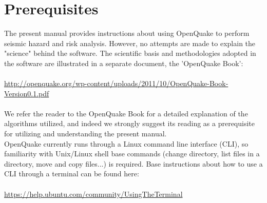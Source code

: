 \section{Prerequisites}
The present manual provides instructions about using OpenQuake to perform seismic hazard and risk analysis. However, no attempts are made to explain the "science" behind the software. The scientific basis and methodologies adopted in the software are illustrated in a separate document, the 'OpenQuake Book':\\ \\
\href{http://openquake.org/wp-content/uploads/2011/10/OpenQuake-Book_Version0.1.pdf}
   {http://openquake.org/wp-content/uploads/2011/10/OpenQuake-Book-Version0.1.pdf}\\ \\
We refer the reader to the OpenQuake Book for a detailed explanation of the algorithms utilized, and indeed we strongly suggest its reading as a prerequisite for utilizing and understanding the present manual.\\
OpenQuake currently runs through a Linux command line interface (CLI), so familiarity with Unix/Linux shell base commands (change directory, list files in a directory, move and copy files...) is required. Base instructions about how to use a CLI through a terminal can be found here: \\ \\
\href{https://help.ubuntu.com/community/UsingTheTerminal}
   {https://help.ubuntu.com/community/UsingTheTerminal}\\

